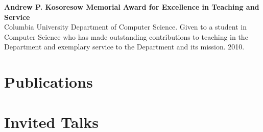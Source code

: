 \documentclass[10pt]{article}
\begin{document}
\textbf{Andrew P. Kosoresow Memorial Award for Excellence in Teaching and Service}  \\
Columbia University Department of Computer Science. Given to a student in Computer Science who has made outstanding contributions to teaching in the Department and exemplary service to the Department and its mission. 2010.

\vspace{-5pt}

\section{Publications}

\begin{publications}
\vspace{-5pt}
\vspace{-5pt}

\end{publications}
\vspace{-10pt}

\section{Invited Talks}
\end{document}
